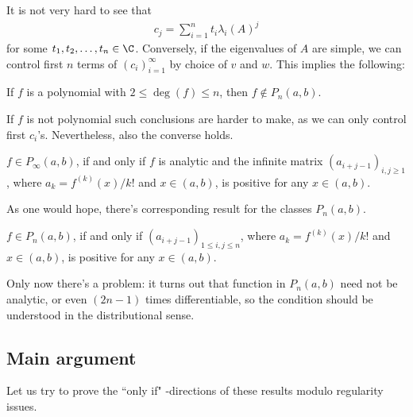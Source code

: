 It is not very hard to see that
\begin{align*}
c_{j} = \sum_{i = 1}^{n} t_{i} \lambda_{i}(A)^{j}
\end{align*}
for some $t_{1}, t_{2}, \ldots, t_{n} \in \C$. Conversely, if the eigenvalues of $A$ are simple, we can control first $n$ terms of $(c_{i})_{i = 1}^{\infty}$ by choice of $v$ and $w$. This implies the following:

\begin{prop}
	If $f$ is a polynomial with $2 \leq \deg(f) \leq n$, then $f \notin P_{n}(a, b)$.
\end{prop}

If $f$ is not polynomial such conclusions are harder to make, as we can only control first $c_{i}$'s. Nevertheless, also the converse holds.

\begin{lause}\label{heuristic_loewner}
	$f \in P_{\infty}(a, b)$, if and only if $f$ is analytic and the infinite matrix $(a_{i + j - 1})_{i, j \geq 1}$, where $a_{k} = f^{(k)}(x)/k!$ and $x \in (a, b)$, is positive for any $x \in (a, b)$.
\end{lause}

As one would hope, there's corresponding result for the classes $P_{n}(a, b)$.

\begin{lause}\label{heuristic_main}
	$f \in P_{n}(a, b)$, if and only if $(a_{i + j - 1})_{1 \leq i, j \leq n}$, where $a_{k} = f^{(k)}(x)/k!$ and $x \in (a, b)$, is positive for any $x \in (a, b)$.
\end{lause}

Only now there's a problem: it turns out that function in $P_{n}(a, b)$ need not be analytic, or even $(2 n - 1)$ times differentiable, so the condition should be understood in the distributional sense.

\subsection{Main argument}

Let us try to prove the ``only if" -directions of these results modulo regularity issues.

